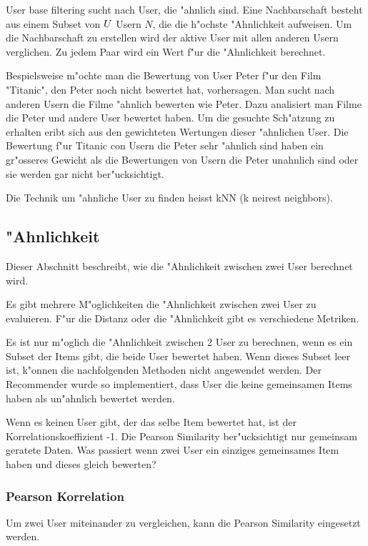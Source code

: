 \documentclass[a4paper, 12pt]{article}
\begin{document}
User base filtering sucht nach User, die "ahnlich sind. Eine Nachbarschaft besteht aus einem Subset von $ \mathnormal{U} $ Usern $N$, die die h"ochste "Ahnlichkeit aufweisen. Um die Nachbarschaft zu erstellen wird der aktive User mit allen anderen Usern verglichen. Zu jedem Paar wird ein Wert f"ur die "Ahnlichkeit berechnet.

Bespielsweise m"ochte man die Bewertung von User Peter f"ur den Film "Titanic", den Peter noch nicht bewertet hat, vorhersagen. Man sucht nach anderen Usern die Filme "ahnlich bewerten wie Peter. Dazu analisiert man Filme die Peter und andere User bewertet haben. Um die gesuchte Sch"atzung zu erhalten eribt sich aus den gewichteten Wertungen dieser "ahnlichen User. Die Bewertung f"ur Titanic con Usern die Peter sehr "ahnlich sind haben ein gr"osseres Gewicht als die Bewertungen von Usern die Peter unahnlich sind oder sie werden gar nicht ber"ucksichtigt.

Die Technik um "ahnliche User zu finden heisst kNN (k neirest neighbors). 

\subsection{"Ahnlichkeit}

Dieser Abschnitt beschreibt, wie die "Ahnlichkeit zwischen zwei User berechnet wird. 

Es gibt mehrere M"oglichkeiten die "Ahnlichkeit zwischen zwei User zu evaluieren. F"ur die Distanz oder die "Ahnlichkeit gibt es verschiedene Metriken. 

Es ist nur m"oglich die "Ahnlichkeit zwischen 2 User zu berechnen, wenn es ein Subset der Items gibt, die beide User bewertet haben. Wenn dieses Subset leer ist, k"onnen die nachfolgenden Methoden nicht angewendet werden. Der Recommender wurde so implementiert, dass User die keine gemeinsamen Items haben als un"ahnlich bewertet werden.

Wenn es keinen User gibt, der das selbe Item bewertet hat, ist der Korrelationskoeffizient -1.
Die Pearson Similarity ber"ucksichtigt nur gemeinsam geratete Daten.
Was passiert wenn zwei User ein einziges gemeinsames Item haben und dieses gleich bewerten?

\subsubsection{Pearson Korrelation}
\label{sec:pearsoncorrelation}

Um zwei User miteinander zu vergleichen, kann die Pearson Similarity eingesetzt werden.
\end{document}
